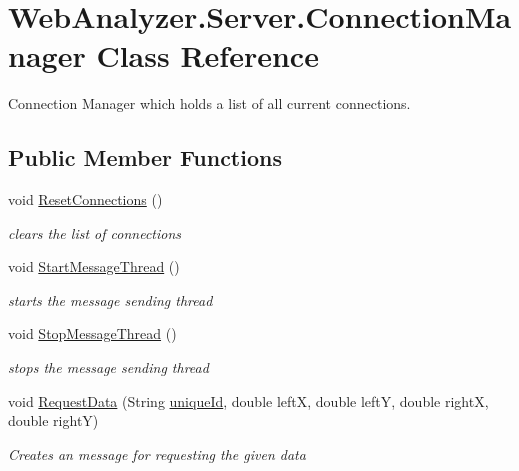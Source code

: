 \hypertarget{class_web_analyzer_1_1_server_1_1_connection_manager}{}\section{Web\+Analyzer.\+Server.\+Connection\+Manager Class Reference}
\label{class_web_analyzer_1_1_server_1_1_connection_manager}


Connection Manager which holds a list of all current connections.  


\subsection*{Public Member Functions}
\begin{DoxyCompactItemize}
\item 
void \hyperlink{class_web_analyzer_1_1_server_1_1_connection_manager_a7fa4617d21e13ed0302001e70ff0f79c}{Reset\+Connections} ()
\begin{DoxyCompactList}\small\item\em clears the list of connections \end{DoxyCompactList}\item 
void \hyperlink{class_web_analyzer_1_1_server_1_1_connection_manager_a6f743e94d77ce575913e2c504cab5057}{Start\+Message\+Thread} ()
\begin{DoxyCompactList}\small\item\em starts the message sending thread \end{DoxyCompactList}\item 
void \hyperlink{class_web_analyzer_1_1_server_1_1_connection_manager_a8cbad625ff934cf233a70ecc2af26d95}{Stop\+Message\+Thread} ()
\begin{DoxyCompactList}\small\item\em stops the message sending thread \end{DoxyCompactList}\item 
void \hyperlink{class_web_analyzer_1_1_server_1_1_connection_manager_a2237bfa6cf4791e578b37e75624b70df}{Request\+Data} (String \hyperlink{_u_i_2_h_t_m_l_resources_2js_2lib_2underscore_8min_8js_af690ff5521d79c7128861033ae80ae17}{unique\+Id}, double left\+X, double left\+Y, double right\+X, double right\+Y)
\begin{DoxyCompactList}\small\item\em Creates an message for requesting the given data \end{DoxyCompactList}\item 

\end{DoxyCompactItemize}
